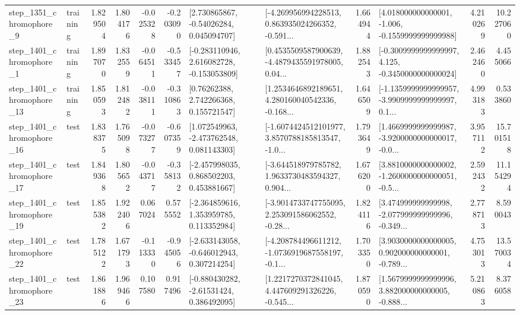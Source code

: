 \begin{tabular}{llrrrrllrlrr}
  step\_1351\_chromophore\_9 &  training &      1.829504 &    1.804176 &     -0.025328 & -0.203090 &     [2.730865867, -0.54026284, 0.045094707] &  [-4.269956994228513, 0.863935024266352, -0.591... &       1.664944 &   [4.018000000000001, -1.006, -0.1559999999999988] &            4.210269 &         10.227060 \\
  step\_1401\_chromophore\_1 &  training &      1.897070 &    1.832559 &     -0.064511 & -0.533457 &   [-0.283110946, 2.616082728, -0.153053809] &  [0.4535509587900639, -4.4879435591978005, 0.04... &       1.882543 &  [-0.3009999999999997, 4.125, -0.3450000000000024] &            2.462460 &          4.455066 \\
 step\_1401\_chromophore\_13 &  training &      1.850593 &    1.812482 &     -0.038111 & -0.310863 &      [0.76262388, 2.742266368, 0.155721547] &  [1.2534646892189651, 4.280160040542336, -0.168... &       1.646509 &  [-1.1359999999999957, -3.9909999999999997, 0.1... &            4.993183 &          0.533860 \\
 step\_1401\_chromophore\_16 &      test &      1.838375 &    1.765098 &     -0.073277 & -0.607359 &    [1.072549963, -2.473762548, 0.081143303] &  [-1.6074424512101977, 3.8570788185813547, -1.0... &       1.793649 &  [1.4669999999999987, -3.9200000000000017, -0.0... &            3.957112 &         15.701518 \\
 step\_1401\_chromophore\_17 &      test &      1.849368 &    1.805652 &     -0.043717 & -0.358132 &    [-2.457998035, 0.868502203, 0.453881667] &  [-3.644518979785782, 1.9633730483594327, 0.904... &       1.676200 &  [3.8810000000000002, -1.2600000000000051, -0.5... &            2.592432 &         11.154294 \\
 step\_1401\_chromophore\_19 &      test &      1.855382 &    1.922406 &      0.067024 &  0.575552 &    [-2.364859616, 1.353959785, 0.113352984] &  [-3.9014733747755095, 2.253091586062552, -0.28... &       1.824116 &  [3.474999999999998, -2.077999999999996, -0.349... &            2.778713 &          8.590043 \\
 step\_1401\_chromophore\_22 &      test &      1.785122 &    1.671793 &     -0.113330 & -0.945056 &   [-2.633143058, -0.646012943, 0.307214254] &  [-4.208784496611212, -1.0736919687558197, -0.1... &       1.703350 &  [3.9030000000000005, 0.902000000000001, -0.789... &            4.753013 &         13.570034 \\
 step\_1401\_chromophore\_23 &      test &      1.861886 &    1.969466 &      0.107580 &  0.917496 &    [-0.880430282, -2.61531424, 0.386492095] &  [1.2217270372841045, 4.447609291326226, -0.545... &       1.870590 &  [1.5679999999999996, 3.882000000000005, -0.888... &            5.210863 &          8.376058 \\

\end{tabular}
